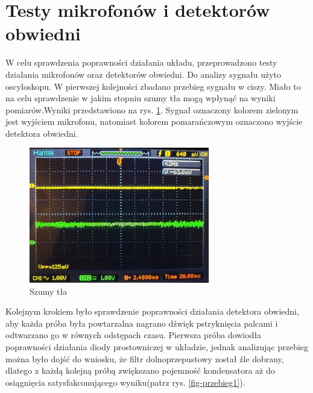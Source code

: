 \documentclass[eng,printmode]{mgr}
\begin{document}
\section{Testy mikrofonów i detektorów obwiedni}
W celu sprawdzenia poprawności działania układu, przeprowadzono testy działania mikrofonów oraz detektorów obwiedni. Do analizy sygnału użyto oscyloskopu. W pierwszej kolejności zbadano przebieg sygnału w ciszy. Miało to na celu sprawdzenie w jakim stopniu szumy tła mogą wpłynąć na wyniki pomiarów.Wyniki przedstawiono na rys. \ref{fig-tlo}. Sygnał oznaczony kolorem zielonym jest wyjściem mikrofonu, natomiast kolorem pomarańczowym oznaczono wyjście detektora obwiedni. 
\begin{figure}[ht]

    \centering

  \includegraphics[width=0.7\textwidth, angle=0]{obwiednia_syg2.png}

    \caption{Szumy tła}
 \label{fig-tlo}
    

\end{figure}

Kolejnym krokiem było sprawdzenie poprawności działania detektora obwiedni, aby każda próba była powtarzalna nagrano dźwięk pstryknięcia palcami i odtwarzano go w równych odstępach czasu. Pierwsza próba dowiodła poprawności działania diody prostowniczej w układzie, jednak analizując przebieg można było dojść do wniosku, że filtr dolnoprzepustowy został źle dobrany, dlatego z każdą kolejną próbą zwiększano pojemność kondensatora aż do osiągnięcia satysfakconującego wyniku(patrz rys. \ref{fig-przebieg1}).
\end{document}
